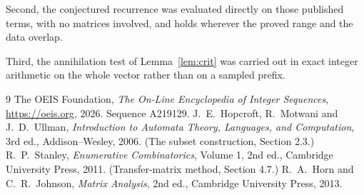 \documentclass[11pt,a4paper]{article}
\theoremstyle{plain}
\theoremstyle{definition}
\begin{document}
Second, the conjectured recurrence was evaluated directly on those published terms, with no
matrices involved, and holds wherever the proved range and the data overlap.

Third, the annihilation test of Lemma~\ref{lem:crit} was carried out in exact integer
arithmetic on the whole vector rather than on a sampled prefix.

\begin{thebibliography}{9}
 The OEIS Foundation, \emph{The On-Line Encyclopedia of Integer
Sequences}, \url{https://oeis.org}, 2026. Sequence A219129.
 J.~E.~Hopcroft, R.~Motwani and J.~D.~Ullman, \emph{Introduction to Automata
Theory, Languages, and Computation}, 3rd ed., Addison--Wesley, 2006. (The subset
construction, Section 2.3.)
 R.~P.~Stanley, \emph{Enumerative Combinatorics}, Volume 1, 2nd ed.,
Cambridge University Press, 2011. (Transfer-matrix method, Section 4.7.)
 R.~A.~Horn and C.~R.~Johnson, \emph{Matrix Analysis}, 2nd ed., Cambridge
University Press, 2013.
\end{thebibliography}
\end{document}
